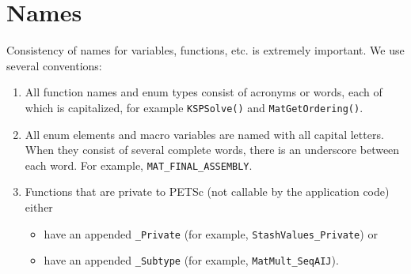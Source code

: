 \section{Names}\label{sec:stylenames}
Consistency of names for variables, functions, etc. is extremely
important.
We use several conventions:
\begin{enumerate}
\item All function names and enum types consist of acronyms or words, each of
  which is capitalized, for example \lstinline{KSPSolve()} and
      \lstinline{MatGetOrdering()}.
\item All enum elements and macro variables are named with all capital letters. When
      they consist of several complete words, there is an underscore between each word.
      For example, \lstinline{MAT_FINAL_ASSEMBLY}.
\item Functions that are private to PETSc (not callable by the
      application code) either
      \begin{itemize}
        \item have an appended \lstinline{_Private} (for example,
           \lstinline{StashValues_Private}) or
        \item have an appended \lstinline{_Subtype} (for example,
           \lstinline{MatMult_SeqAIJ}).
      \end{itemize}


\end{enumerate}
